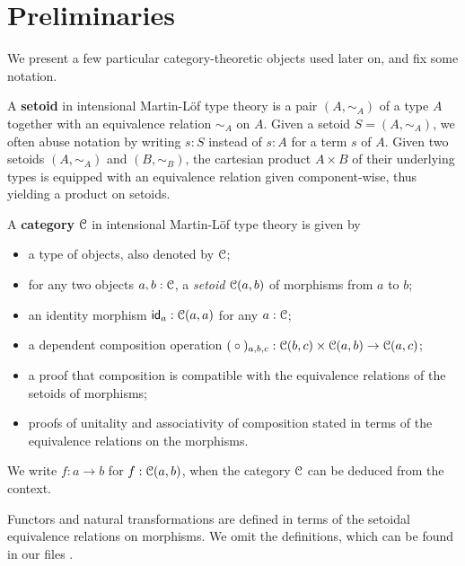 \documentclass[a4paper,USenglish]{lipics}
\newcommand{\parencite}[1]{\cite{#1}}
\newcommand{\fat}[1]{\textbf{#1}}
\begin{document}
\section{Preliminaries}\label{sec:preliminaries}

We present a few particular category-theoretic objects used later on, and fix some notation.

\begin{defn}
  A \fat{setoid} in intensional Martin-Löf type theory is a pair $(A, \sim_A)$ of a type $A$ together with an equivalence 
  relation $\sim_A$ on $A$. Given a setoid $S = (A, \sim_A)$, we often abuse notation by writing $s:S$ instead of $s:A$ for
  a term $s$ of $A$.
  Given two setoids $(A,\sim_A)$ and $(B,\sim_B)$, the cartesian product $A\times B$ of their underlying types is equipped with
  an equivalence relation given component-wise, thus yielding a product on setoids.
\end{defn}



\begin{defn}[Category in IMLTT, \parencite{aczel_galois, concat}]
 \label{def:cat_imltt}
  A \fat{category} ${\mathcal{C}}$ in intensional Martin-Löf type theory  is given by
  \begin{itemize}
   \item a type of objects, also denoted by ${\mathcal{C}}$;
   \item for any two objects $a,b:{\mathcal{C}}$, a \emph{setoid} ${\mathcal{C}}(a,b)$ of morphisms from $a$ to $b$;
   \item an identity morphism $\mathsf{id}_a : {\mathcal{C}}(a,a)$ for any $a:{\mathcal{C}}$;
   \item a dependent composition operation $({} \circ {})_{a,b,c} : {\mathcal{C}}(b,c) \times {\mathcal{C}}(a,b) \to {\mathcal{C}}(a,c)$;
   \item a proof that composition is compatible with the equivalence relations of the setoids of morphisms;
   \item proofs of unitality and associativity of composition stated in terms of the equivalence relations on the morphisms.
  \end{itemize}
  We write $f:a\to b$ for $f : {\mathcal{C}}(a,b)$, when the category ${\mathcal{C}}$ can be deduced from the context.
\end{defn}

Functors and natural transformations are defined in terms of the setoidal equivalence relations on morphisms.
We omit the definitions, which can be found in our \coq files \parencite{trimat_coq}.
\end{document}
